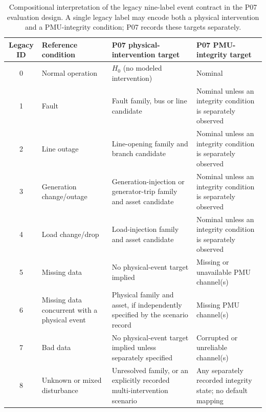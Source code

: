 \begin{table}[t]
\centering
\caption{Compositional interpretation of the legacy nine-label event contract in the P07 evaluation design. A single legacy label may encode both a physical intervention and a PMU-integrity condition; P07 records these targets separately.}
\label{tab:legacy-event-mapping}
\footnotesize
\setlength{\tabcolsep}{4pt}
\renewcommand{\arraystretch}{1.12}
\begin{tabularx}{\textwidth}{@{}c l X X@{}}
\toprule
Legacy ID & Reference condition & P07 physical-intervention target & P07 PMU-integrity target \\
\midrule
0 & Normal operation & $H_0$ (no modeled intervention) & Nominal \\
1 & Fault & Fault family, bus or line candidate & Nominal unless an integrity condition is separately observed \\
2 & Line outage & Line-opening family and branch candidate & Nominal unless an integrity condition is separately observed \\
3 & Generation change/outage & Generation-injection or generator-trip family and asset candidate & Nominal unless an integrity condition is separately observed \\
4 & Load change/drop & Load-injection family and asset candidate & Nominal unless an integrity condition is separately observed \\
5 & Missing data & No physical-event target implied & Missing or unavailable PMU channel(s) \\
6 & Missing data concurrent with a physical event & Physical family and asset, if independently specified by the scenario record & Missing PMU channel(s) \\
7 & Bad data & No physical-event target implied unless separately specified & Corrupted or unreliable channel(s) \\
8 & Unknown or mixed disturbance & Unresolved family, or an explicitly recorded multi-intervention scenario & Any separately recorded integrity state; no default mapping \\
\bottomrule
\end{tabularx}
\end{table}
